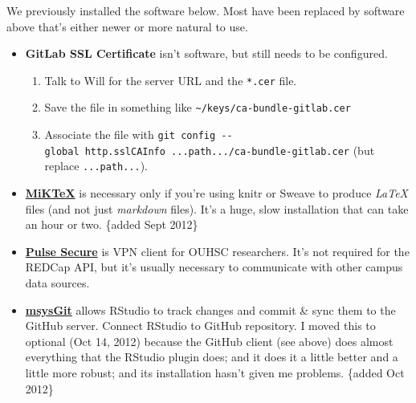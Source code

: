 \documentclass[
]{book}
\providecommand{\tightlist}{%
  \setlength{\itemsep}{0pt}\setlength{\parskip}{0pt}}
\begin{document}
We previously installed the software below. Most have been replaced by software above that's either newer or more natural to use.

\begin{itemize}
\item
  \textbf{GitLab SSL Certificate} isn't software, but still needs to be configured.

  \begin{enumerate}
  \def\labelenumi{\arabic{enumi}.}
  \tightlist
  \item
    Talk to Will for the server URL and the \texttt{*.cer} file.
  \item
    Save the file in something like \texttt{\textasciitilde{}/keys/ca-bundle-gitlab.cer}
  \item
    Associate the file with \texttt{git\ config\ -\/-global\ http.sslCAInfo\ ...path.../ca-bundle-gitlab.cer} (but replace \texttt{...path...}).
  \end{enumerate}
\item
  \textbf{\href{http://miktex.org/}{MiKTeX}} is necessary only if you're using knitr or Sweave to produce \emph{LaTeX} files (and not just \emph{markdown} files). It's a huge, slow installation that can take an hour or two. \{added Sept 2012\}
\item
  \textbf{\href{https://connect.ouhsc.edu}{Pulse Secure}} is VPN client for OUHSC researchers. It's not required for the REDCap API, but it's usually necessary to communicate with other campus data sources.
\item
  \textbf{\href{http://msysgit.github.com/}{msysGit}} allows RStudio to track changes and commit \& sync them to the GitHub server. Connect RStudio to GitHub repository. I moved this to optional (Oct 14, 2012) because the GitHub client (see above) does almost everything that the RStudio plugin does; and it does it a little better and a little more robust; and its installation hasn't given me problems. \{added Oct 2012\}


\end{itemize}
\end{document}
